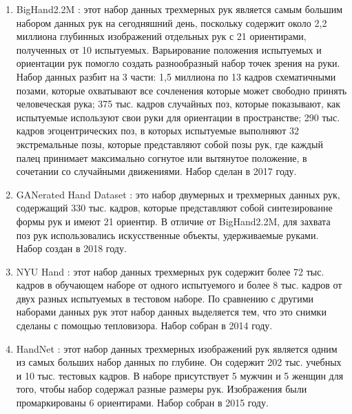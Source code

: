 \begin{enumerate}[label=\arabic*)]
	
	\item BigHand2.2M \cite{BigHand2.2M}: этот набор данных трехмерных рук является самым большим набором данных рук на сегодняшний день, поскольку содержит около 2,2 миллиона глубинных изображений отдельных рук с 21 ориентирами, полученных от 10 испытуемых.
	Варьирование положения испытуемых и ориентации рук помогло создать разнообразный набор точек зрения на руки.
	Набор данных разбит на 3 части: 1,5 миллиона по 13 кадров схематичными позами, которые охватывают все сочленения которые может свободно принять человеческая рука; 375 тыс. кадров случайных поз, которые показывают, как испытуемые используют свои руки для ориентации в пространстве; 290 тыс. кадров эгоцентрических поз, в которых испытуемые выполняют 32 экстремальные позы, которые представляют собой позы рук, где каждый палец принимает максимально согнутое или вытянутое положение, в сочетании со случайными движениями.
	Набор сделан в 2017 году.
	
	\item GANerated Hand Dataset \cite{GANeratedHands_CVPR2018}: это набор двумерных и трехмерных данных рук, содержащий 330 тыс. кадров, которые представляют собой синтезированне формы рук и имеют 21 ориентир.
	В отличие от BigHand2.2M, для захвата поз рук использовались искусственные объекты, удерживаемые руками.
	Набор создан в 2018 году. 
	
	\item NYU Hand \cite{tompson14tog}: этот набор данных трехмерных рук содержит более 72 тыс. кадров в обучающем наборе от одного испытуемого и более 8 тыс. кадров от двух разных испытуемых в тестовом наборе.
	По сравнению с другими наборами данных рук этот набор данных выделяется тем, что это снимки сделаны с помощью тепловизора. 
	Набор собран в 2014 году.
	
	\item HandNet \cite{WetzlerBMVC15}: этот набор данных трехмерных изображений рук является одним из самых больших набор данных по глубине.
	Он содержит 202 тыс. учебных и 10 тыс. тестовых кадров.
	В наборе присутствует 5 мужчин и 5 женщин для того, чтобы набор содержал разные размеры рук.
	Изображения были промаркированы 6 ориентирами.
	Набор собран в 2015 году.
	
	
\end{enumerate}



 


